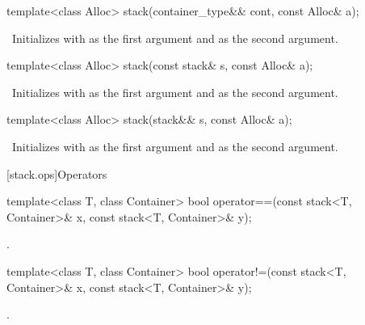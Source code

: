 \begin{codeblock}
\begin{codeblock}
\begin{codeblock}
%
\begin{itemdecl}
template<class Alloc> stack(container_type&& cont, const Alloc& a);
\end{itemdecl}

\begin{itemdescr}
\pnum
\effects\ Initializes  with  as the first argument and 
as the second argument.
\end{itemdescr}

%
\begin{itemdecl}
template<class Alloc> stack(const stack& s, const Alloc& a);
\end{itemdecl}

\begin{itemdescr}
\pnum
\effects\ Initializes  with  as the first argument and 
as the second argument.
\end{itemdescr}

%
\begin{itemdecl}
template<class Alloc> stack(stack&& s, const Alloc& a);
\end{itemdecl}

\begin{itemdescr}
\pnum
\effects\ Initializes  with  as the first argument and 
as the second argument.
\end{itemdescr}

[stack.ops]{Operators}

%
\begin{itemdecl}
template<class T, class Container>
  bool operator==(const stack<T, Container>& x, const stack<T, Container>& y);
\end{itemdecl}

\begin{itemdescr}
\pnum
\returns
{}.
\end{itemdescr}

%
\begin{itemdecl}
template<class T, class Container>
  bool operator!=(const stack<T, Container>& x, const stack<T, Container>& y);
\end{itemdecl}

\begin{itemdescr}
\pnum
\returns
{}.
\end{itemdescr}


\end{codeblock}
\end{codeblock}
\end{codeblock}
